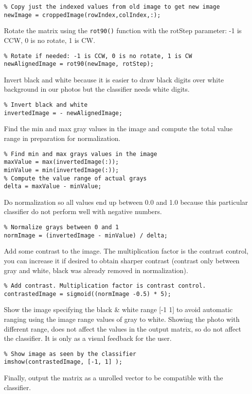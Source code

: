 \begin{verbatim}
% Copy just the indexed values from old image to get new image
newImage = croppedImage(rowIndex,colIndex,:);
\end{verbatim}
Rotate the matrix using the \verb|rot90()| function with the rotStep parameter: -1 is CCW, 0 is no rotate, 1 is CW.
\begin{verbatim}
% Rotate if needed: -1 is CCW, 0 is no rotate, 1 is CW
newAlignedImage = rot90(newImage, rotStep);
\end{verbatim}
Invert black and white because it is easier to draw black digits over white background in our photos but the classifier needs white digits.
\begin{verbatim}
% Invert black and white
invertedImage = - newAlignedImage;
\end{verbatim}
Find the min and max gray values in the image and compute the total value range in preparation for normalization.
\begin{verbatim}
% Find min and max grays values in the image
maxValue = max(invertedImage(:));
minValue = min(invertedImage(:));
% Compute the value range of actual grays
delta = maxValue - minValue;
\end{verbatim}
Do normalization so all values end up between 0.0 and 1.0 because this particular classifier do not perform well with negative numbers.
\begin{verbatim}
% Normalize grays between 0 and 1
normImage = (invertedImage - minValue) / delta;
\end{verbatim}
Add some contrast to the image. The multiplication factor is the contrast control, you can increase it if desired to obtain sharper contrast (contrast only between gray and white, black was already removed in normalization).
\begin{verbatim}
% Add contrast. Multiplication factor is contrast control.
contrastedImage = sigmoid((normImage -0.5) * 5);
\end{verbatim}
Show the image specifying the black \& white range [-1 1] to avoid automatic ranging using the image range values of gray to white. Showing the photo with different range, does not affect the values in the output matrix, so do not affect the classifier. It is only as a visual feedback for the user.
\begin{verbatim}
% Show image as seen by the classifier
imshow(contrastedImage, [-1, 1] );
\end{verbatim}
Finally, output the matrix as a unrolled vector to be compatible with the classifier.

